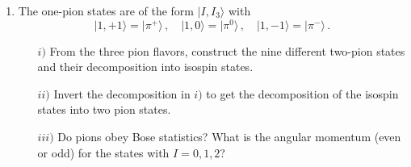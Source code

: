 
\begin{enumerate}


\item The one-pion states are of the form $|I,I_{3}\rangle$ with
\begin{equation}
|1,+1\rangle=|\pi^{+}\rangle\,,\quad |1,0\rangle=|\pi^{0}\rangle\,,\quad |1,-1\rangle=|\pi^{-}\rangle\,.
\end{equation}
\begin{itemize}
\item[$i)$] From the three pion flavors, construct the nine different two-pion states and their decomposition into isospin states.
\item[$ii)$] Invert the decomposition in $i)$ to get the decomposition of the isospin states into two pion states.
\item[$iii)$] Do pions obey Bose statistics? What is the angular momentum (even or odd) for the states with $I=0,1,2$?
\end{itemize}

\end{enumerate}


